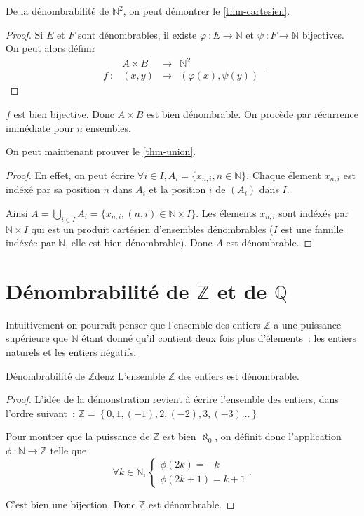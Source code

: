 \documentclass[a4paper,french,final]{memoir}
\begin{document}
De la dénombrabilité de $\mathbb{N}^2$, on peut démontrer le \cref{thm-cartesien}. 

\begin{proof}
	Si $E$ et $F$ sont dénombrables, il existe $\varphi~: E \to \mathbb{N}$ et $\psi~: F \to \mathbb{N}$ bijectives. On peut alors définir \[ \begin{array}{cccc}
	\ & A \times B & \to & \mathbb{N}^2 \\
	f~: & (x,y) & \mapsto & (\varphi(x), \psi(y))
	\end{array}.\]
	
\end{proof}

$f $ est bien bijective. Donc $A \times B$ est bien dénombrable. On procède par récurrence immédiate pour $n$ ensembles. 

On peut maintenant prouver le \cref{thm-union}. 


\begin{proof}
	En effet, on peut écrire $\forall i \in I, A_i = \{x_{n,i}, n \in \mathbb{N}\}$. Chaque élement $x_{n, i}$ est indéxé par sa position $n$ dans $A_i$ et la position $i$ de $(A_i)$ dans $I$. 
	
	Ainsi $A = \bigcup_{i \in I} A_i = \{x_{n, i}, (n,i) \in \mathbb{N} \times I\}$. Les élements $x_{n,i}$ sont indéxés par $\mathbb{N} \times I$ qui est un produit cartésien d'ensembles dénombrables ($I$ est une famille indéxée par $\mathbb{N}$, elle est bien dénombrable). Donc $A$ est dénombrable.
\end{proof}


\section{\texorpdfstring{Dénombrabilité de $\mathbb{Z}$ et de $\mathbb{Q}$}{}}

Intuitivement on pourrait penser que l'ensemble des entiers $\mathbb{Z}$ a une puissance supérieure que $\mathbb{N}$ étant donné qu'il contient deux fois plus d'élements~: les entiers naturels et les entiers négatifs. 

\begin{theoremb}{Dénombrabilité de $\mathbb{Z}$}{denz}
	L'ensemble $\mathbb{Z}$ des entiers est dénombrable. 
\end{theoremb}

\begin{proof}
L'idée de la démonstration revient à écrire l'ensemble des entiers, dans l'ordre suivant~:  $\mathbb{Z}=\left\lbrace 0,1,(-1),2,(-2),3,(-3) \dots\right\rbrace$ 

	Pour montrer que la puissance de $\mathbb{Z}$ est bien $\aleph_0$, on définit donc l'application $\phi~: \mathbb{N} \to \mathbb{Z}$ telle que \[ \forall k \in \mathbb{N}, \left\lbrace \begin{array}{c}
	\phi(2k) = -k \\
	\phi(2k + 1) = k+1
	\end{array} \right. .\]
	
	C'est bien une bijection. Donc $\mathbb{Z}$ est dénombrable. 
\end{proof}
\end{document}
